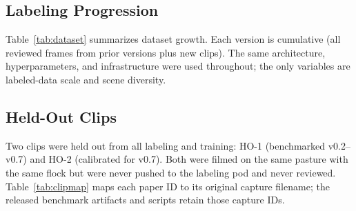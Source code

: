 \documentclass[11pt]{article}
\begin{document}
\subsection{Labeling Progression}
Table~\ref{tab:dataset} summarizes dataset growth. Each version is cumulative
(all reviewed frames from prior versions plus new clips). The same architecture,
hyperparameters, and infrastructure were used throughout; the only variables are
labeled-data scale and scene diversity.

\begin{table}[t]
  \centering
  \caption{Dataset growth across versions. Validation mAP is reported from the
  Ultralytics training logs (see Data Availability); pixel residual $\sigma$ is
  on the HO-1 held-out clip.}
  \label{tab:dataset}
\end{table}

\subsection{Held-Out Clips}
\label{sec:heldout}
Two clips were held out from all labeling and training: HO-1 (benchmarked
v0.2--v0.7) and HO-2 (calibrated for v0.7). Both were filmed on the same pasture
with the same flock but were never pushed to the labeling pod and never reviewed.
Table~\ref{tab:clipmap} maps each paper ID to its original capture filename; the
released benchmark artifacts and scripts retain those capture IDs.

\begin{table}[t]
  \centering
  \caption{Held-out clip identities. The paper IDs HO-1 and HO-2 map to the
  original capture filenames used throughout the released benchmark artifacts and
  scripts (e.g.\ \texttt{bench\_report-IMG\_3651-3way.json}).}
  \label{tab:clipmap}
\end{table}
\end{document}
